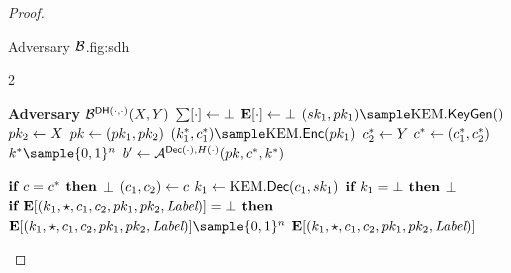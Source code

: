 \begin{proof}
\begin{itemize}
                                    \begin{gamefigure}{Adversary $\mathcal{B}$.}{fig:sdh}
                                        \begin{games}{2}
                                            \begin{gameenv}{\textbf{Adversary} $\mathcal{B}^{\textsf{DH}(\cdot, \cdot)}(X, Y)$}
                                                \State $\sum[\cdot] \leftarrow \bot$
                                                \State $\mathbf{E}[\cdot] \leftarrow \bot$
                                                \State $(\sk_1, \pk_1) \sample \kem.\keygen()$
                                                \State $pk_2 \leftarrow X$
                                                \State $pk \leftarrow (pk_1, pk_2)$
                                                \State $(k^*_1, c^*_1) \sample \kem.\enc(\pk_1)$
                                                \State $c^*_2 \leftarrow Y$
                                                \State $c^* \leftarrow (c^*_1, c^*_2)$
                                                \State $k^* \sample \bits^{n}$
                                                \State $b' \leftarrow \mathcal{A}^{\textsf{Dec}(\cdot), H(\cdot)}(pk, c^*, k^*)$
                                            \end{gameenv}
                                            \gamebreak
                                            \begin{gameenv}{\oracledec}
                                                \State $\textbf{if } c = c^* \textbf{ then}$
                                                    \State \quad \Return $\bot$
                                                    \State $(c_1, c_2) \leftarrow c$
                                                    \State $k_1 \leftarrow \text{KEM}.\textsf{Dec}(c_1, sk_1)$
                                                    \State $\textbf{if } k_1 = \bot \textbf{ then}$
                                                        \State \quad \Return $\bot$
                                                        \State $\textbf{if } \mathbf{E}[(k_1, \star, c_1, c_2, pk_1, pk_2,\textit{Label})] = \bot \textbf{ then}$
                                                            \State \quad $\pset{E}[(k_1, \marker, c_1, c_2, \pk_1, \pk_2,\lbl)] \sample \bits^{n}$
                                                            \State \Return $\mathbf{E}[(k_1, \star, c_1, c_2, pk_1, pk_2,\textit{Label})]$
                                                            \Statex
                                                            \State \underline{}

\end{gameenv}
\end{games}
\end{gamefigure}
\end{itemize}
\end{proof}
